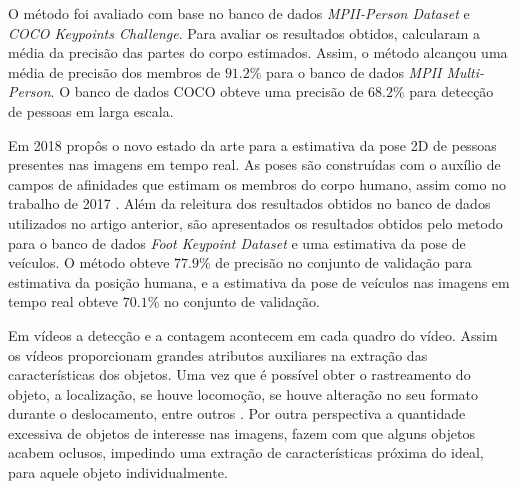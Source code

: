 O método foi avaliado com base no banco de dados \textit{MPII-Person Dataset} e \textit{COCO Keypoints Challenge}. Para avaliar os resultados obtidos, \cite{Cao2017} calcularam a média da precisão das partes do corpo estimados. Assim, o método alcançou uma média de precisão dos membros de $91.2\%$ para o banco de dados \textit{MPII Multi-Person}. O banco de dados COCO obteve uma precisão de $68.2\%$ para detecção de pessoas em larga escala.

Em 2018 \cite{Cao2018} propôs o novo estado da arte para a estimativa da pose 2D de pessoas presentes nas imagens em tempo real. As poses são construídas com o auxílio de campos de afinidades que estimam os membros do corpo humano, assim como no trabalho de 2017 \cite{Cao2017}. Além da releitura dos resultados obtidos no banco de dados utilizados no artigo anterior, são apresentados os resultados obtidos pelo metodo para o banco de dados \textit{Foot Keypoint Dataset} e uma estimativa da pose de veículos. O método obteve $77.9\%$ de precisão no conjunto de validação para estimativa da posição humana, e a estimativa da pose de veículos nas imagens em tempo real obteve $70.1\%$ no conjunto de validação. 


Em vídeos a detecção e a contagem acontecem em cada quadro do vídeo. Assim os vídeos proporcionam grandes atributos auxiliares na  extração das características dos objetos. Uma vez que é possível obter o rastreamento do objeto, a localização, se houve locomoção, se houve alteração no seu formato durante o deslocamento, entre outros . Por outra perspectiva a quantidade excessiva de objetos de interesse nas imagens, fazem com que alguns objetos acabem oclusos, impedindo uma extração de características próxima do ideal, para aquele objeto individualmente.


